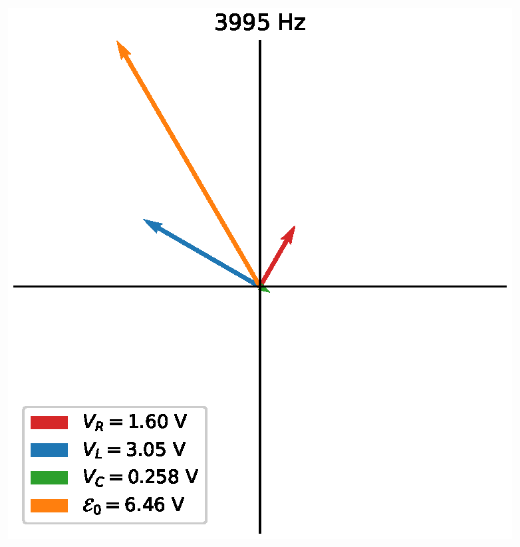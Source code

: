 \documentclass[12pt]{iopart} %
\begin{document}
\includegraphics{media/part_3_3995_hz.eps}
\end{document}
